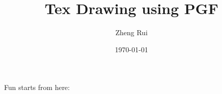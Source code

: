 \documentclass[12pt, a4paper]{article}
\title{\textbf{Tex Drawing using PGF}}
\author{Zheng Rui}
\date{\today}
\begin{document}
\maketitle

Fun starts from here:

\tiny





\end{document}
